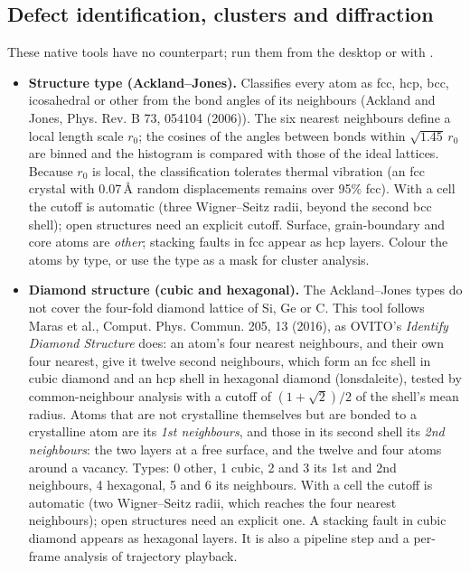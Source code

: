 \subsection{Defect identification, clusters and diffraction}\label{sec:defect-tools}
These native tools have no  counterpart; run them from the desktop or with .
\begin{itemize}
\item \textbf{Structure type (Ackland--Jones).} Classifies every atom as fcc, hcp, bcc, icosahedral or other from the bond angles of its neighbours (Ackland and Jones, Phys. Rev. B 73, 054104 (2006)). The six nearest neighbours define a local length scale $r_0$; the cosines of the angles between bonds within $\sqrt{1.45}\,r_0$ are binned and the histogram is compared with those of the ideal lattices. Because $r_0$ is local, the classification tolerates thermal vibration (an fcc crystal with 0.07\,\AA{} random displacements remains over 95\% fcc). With a cell the cutoff is automatic (three Wigner--Seitz radii, beyond the second bcc shell); open structures need an explicit cutoff. Surface, grain-boundary and core atoms are \emph{other}; stacking faults in fcc appear as hcp layers. Colour the atoms by type, or use the type as a mask for cluster analysis.
\item \textbf{Diamond structure (cubic and hexagonal).} The Ackland--Jones types do not cover the four-fold diamond lattice of Si, Ge or C. This tool follows Maras et al., Comput. Phys. Commun. 205, 13 (2016), as OVITO's \emph{Identify Diamond Structure} does: an atom's four nearest neighbours, and their own four nearest, give it twelve second neighbours, which form an fcc shell in cubic diamond and an hcp shell in hexagonal diamond (lonsdaleite), tested by common-neighbour analysis with a cutoff of $(1+\sqrt2)/2$ of the shell's mean radius. Atoms that are not crystalline themselves but are bonded to a crystalline atom are its \emph{1st neighbours}, and those in its second shell its \emph{2nd neighbours}: the two layers at a free surface, and the twelve and four atoms around a vacancy. Types: 0 other, 1 cubic, 2 and 3 its 1st and 2nd neighbours, 4 hexagonal, 5 and 6 its neighbours. With a cell the cutoff is automatic (two Wigner--Seitz radii, which reaches the four nearest neighbours); open structures need an explicit one. A stacking fault in cubic diamond appears as hexagonal layers. It is also a  pipeline step and a per-frame analysis of trajectory playback.

\end{itemize}
